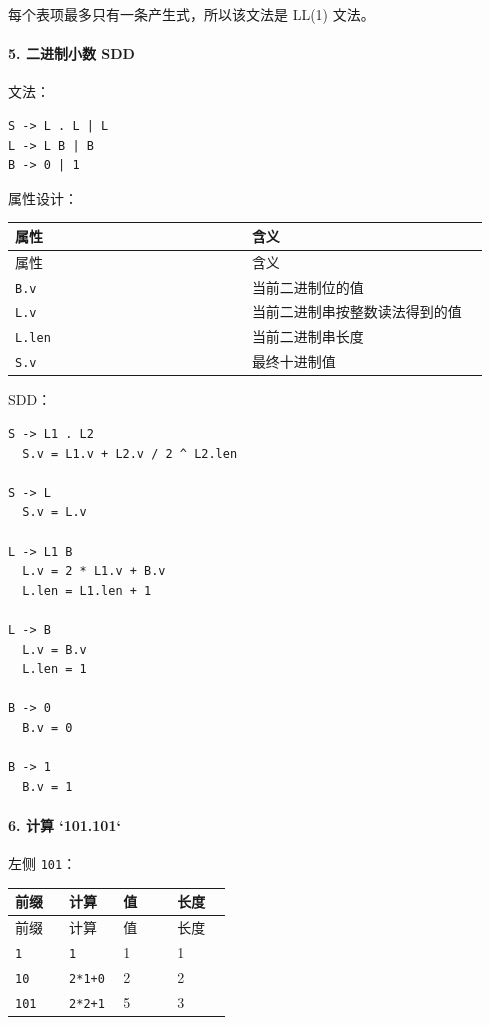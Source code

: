 \documentclass[UTF8]{ctexart}
\begin{document}
每个表项最多只有一条产生式，所以该文法是 LL(1) 文法。

\paragraph*{5. 二进制小数 SDD}

文法：

\begin{Verbatim}[fontsize=\small,breaklines=true]
S -> L . L | L
L -> L B | B
B -> 0 | 1
\end{Verbatim}

属性设计：

\begin{longtable}{|p{0.47\linewidth}|p{0.47\linewidth}|}
\hline
属性 & 含义 \\
\hline
\endfirsthead
属性 & 含义 \\
\hline
\endhead
\texttt{B.v} & 当前二进制位的值 \\
\hline
\texttt{L.v} & 当前二进制串按整数读法得到的值 \\
\hline
\texttt{L.len} & 当前二进制串长度 \\
\hline
\texttt{S.v} & 最终十进制值 \\
\hline
\end{longtable}

SDD：

\begin{Verbatim}[fontsize=\small,breaklines=true]
S -> L1 . L2
  S.v = L1.v + L2.v / 2 ^ L2.len

S -> L
  S.v = L.v

L -> L1 B
  L.v = 2 * L1.v + B.v
  L.len = L1.len + 1

L -> B
  L.v = B.v
  L.len = 1

B -> 0
  B.v = 0

B -> 1
  B.v = 1
\end{Verbatim}

\paragraph*{6. 计算 `101.101`}

左侧 \texttt{101}：

\begin{longtable}{|p{0.23\linewidth}|p{0.23\linewidth}|p{0.23\linewidth}|p{0.23\linewidth}|}
\hline
前缀 & 计算 & 值 & 长度 \\
\hline
\endfirsthead
前缀 & 计算 & 值 & 长度 \\
\hline
\endhead
\texttt{1} & \texttt{1} & 1 & 1 \\
\hline
\texttt{10} & \texttt{2*1+0} & 2 & 2 \\
\hline
\texttt{101} & \texttt{2*2+1} & 5 & 3 \\
\hline
\end{longtable}
\end{document}
